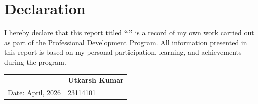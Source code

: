 \vspace{-0.6cm}

\chapter*{Declaration}

I hereby declare that this report titled \textbf{``\ttitle''} is a record of my own work carried out as part of the Professional Development Program. All information presented in this report is based on my personal participation, learning, and achievements during the program.

\vspace{1em}
\noindent
\begin{tabular}{p{} p{}}
& \hfill \textbf{Utkarsh Kumar} \\
Date: April, 2026  & \hfill 23114101 \\
\end{tabular}

\clearpage

